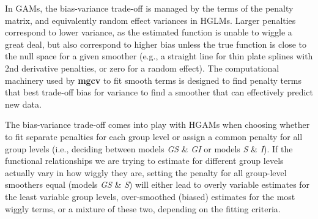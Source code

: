 \documentclass[12pt]{article}
\begin{document}
In GAMs, the bias-variance trade-off is managed by the terms of the
penalty matrix, and equivalently random effect variances in HGLMs.
Larger penalties correspond to lower variance, as the estimated function
is unable to wiggle a great deal, but also correspond to higher bias
unless the true function is close to the null space for a given smoother
(e.g., a straight line for thin plate splines with 2nd derivative
penalties, or zero for a random effect). The computational machinery
used by \textbf{mgcv} to fit smooth terms is designed to find penalty
terms that best trade-off bias for variance to find a smoother that can
effectively predict new data.

The bias-variance trade-off comes into play with HGAMs when choosing
whether to fit separate penalties for each group level or assign a
common penalty for all group levels (i.e., deciding between models
\emph{GS} \& \emph{GI} or models \emph{S} \& \emph{I}). If the
functional relationships we are trying to estimate for different group
levels actually vary in how wiggly they are, setting the penalty for all
group-level smoothers equal (models \emph{GS} \& \emph{S}) will either
lead to overly variable estimates for the least variable group levels,
over-smoothed (biased) estimates for the most wiggly terms, or a mixture
of these two, depending on the fitting criteria.
\end{document}
